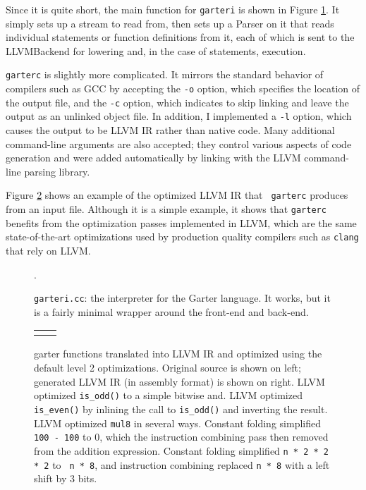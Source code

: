 \documentclass[11pt]{article}
\begin{document}
Since it is quite short, the main function for {\tt garteri} is shown in Figure
\ref{fig:garteri}.  It simply sets up a stream to read from, then sets up a
Parser on it that reads individual statements or function definitions from it,
each of which is sent to the LLVMBackend for lowering and, in the case of
statements, execution.

{\tt garterc} is slightly more complicated.  It mirrors the standard behavior of
compilers such as GCC by accepting the {\tt -o} option, which specifies the
location of the output file, and the {\tt -c} option, which indicates to skip
linking and leave the output as an unlinked object file.  In addition, I
implemented a {\tt -l} option, which causes the output to be LLVM IR rather than
native code.  Many additional command-line arguments are also accepted; they
control various aspects of code generation and were added automatically by
linking with the LLVM command-line parsing library.

Figure \ref{fig:test} shows an example of the optimized LLVM IR that {\tt
garterc} produces from an input file.  Although it is a simple example, it shows
that {\tt garterc} benefits from the optimization passes implemented in LLVM,
which are the same state-of-the-art optimizations used by production quality
compilers such as {\tt clang} that rely on LLVM.

\begin{figure}
    \lstset{language=C++}
    \lstset{numbers=left}
    
    \caption{{\tt garteri.cc}:  the interpreter for the Garter language.  It
        works, but it is a fairly minimal wrapper around the front-end and
    back-end.}
    \label{fig:garteri}.
\end{figure}

\begin{figure}
    \begin{tabular}{p{7cm}p{9cm}}
        
        &
        
    \end{tabular}
    \caption{garter functions translated into LLVM IR and optimized using the
            default level 2 optimizations.  Original source is shown on left;
            generated LLVM IR (in assembly format) is shown on right.  LLVM
            optimized {\tt is\_odd()} to a simple bitwise and.  LLVM optimized
            {\tt is\_even()} by inlining the call to {\tt is\_odd()} and
            inverting the result.  LLVM optimized {\tt mul8} in several ways.
            Constant folding simplified {\tt 100 - 100} to 0, which the
            instruction combining pass then removed from the addition
            expression.  Constant folding simplified {\tt n * 2 * 2 * 2} to {\tt
            n * 8}, and instruction combining replaced {\tt n * 8} with a left
            shift by 3 bits.
    }
    \label{fig:test}
\end{figure}
\end{document}
